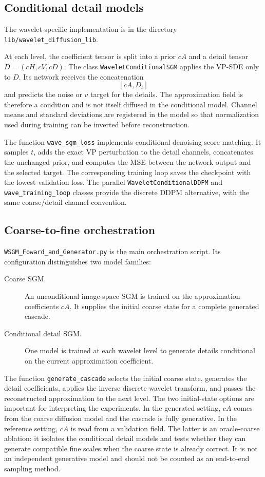 \subsection{Conditional detail models}

The wavelet-specific implementation is in the directory
\lstinline|lib/wavelet_diffusion_lib|.

At each level, the coefficient tensor is split into a prior $cA$ and a detail tensor
$D=(cH,cV,cD)$. The class \lstinline|WaveletConditionalSGM| applies the VP-SDE
only to $D$. Its network receives the concatenation
\[
    [cA,D_t]
\]
and predicts the noise or $v$ target for the details. The approximation field
is therefore a condition and is not itself diffused in the conditional model.
Channel means and standard deviations are registered in the model so that
normalization used during training can be inverted before reconstruction.

The function \lstinline|wave_sgm_loss| implements conditional denoising score
matching. It samples $t$, adds the exact VP perturbation to the detail
channels, concatenates the unchanged prior, and computes the MSE between the
network output and the selected target. The corresponding training loop saves
the checkpoint with the lowest validation loss. The parallel
\lstinline|WaveletConditionalDDPM| and \lstinline|wave_training_loop| classes
provide the discrete DDPM alternative, with the same coarse/detail channel
convention.

\subsection{Coarse-to-fine orchestration}

\lstinline|WSGM_Foward_and_Generator.py| is the main orchestration script. Its
configuration distinguishes two model families:

\begin{description}
\item[Coarse SGM.] An unconditional image-space SGM is trained on the
  approximation coefficients $cA$. It supplies the initial coarse state for a
  complete generated cascade.
\item[Conditional detail SGM.] One model is trained at each wavelet level to
  generate details conditional on the current approximation coefficient.
\end{description}

The function \lstinline|generate_cascade| selects the initial coarse state,
generates the detail coefficients, applies the inverse discrete wavelet
transform, and passes the reconstructed approximation to the next level. The
two initial-state options are important for interpreting the experiments. In
the generated setting, $cA$ comes from the coarse diffusion model and the
cascade is fully generative. In the reference setting, $cA$ is read from a
validation field. The latter is an oracle-coarse ablation: it isolates the
conditional detail models and tests whether they can generate compatible fine
scales when the coarse state is already correct. It is not an independent
generative model and should not be counted as an end-to-end sampling method.

